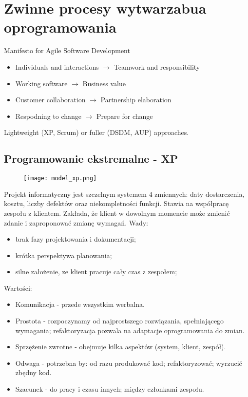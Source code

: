 \documentclass[a4paper]{article}
\begin{document}
\section{Zwinne procesy wytwarzabua oprogramowania}
Manifesto for Agile Software Development
\begin{itemize}
    \item Individuals and interactions $\rightarrow$ Teamwork and responsibility
    \item Working software $\rightarrow$ Business value
    \item Customer collaboration $\rightarrow$ Partnership elaboration
    \item Respodning to change $\rightarrow$ Prepare for change
\end{itemize}
Lightweight (XP, Scrum) or fuller (DSDM, AUP) approaches.

\subsection{Programowanie ekstremalne - XP}
\begin{figure}[!h]
    \texttt{[image: model\_xp.png]}
\end{figure}

Projekt informatyczny jest szczelnym systemem 4 zmiennych: daty dostarczenia, kosztu, liczby
defektów oraz niekompletności funkcji. Stawia na współpracę zespołu z klientem. Zakłada, że klient w dowolnym momencie może
zmienić zdanie i zaproponować zmianę wymagań.
Wady:
\begin{itemize}
    \item brak fazy projektowania i dokumentacji;
    \item krótka perspektywa planowania;
    \item silne założenie, ze klient pracuje cały czas z
zespołem;
\end{itemize}

Wartości:
    \begin{itemize}
        \item Komunikacja - przede wszystkim werbalna.
        \item Prostota - rozpoczynamy od najprostszego rozwiązania, spełniającego
wymagania; refaktoryzacja pozwala na adaptacje oprogramowania do
zmian.
        \item Sprzężenie zwrotne - obejmuje kilka aspektów (system, klient, zespół).
        \item Odwaga - potrzebna by: od razu produkować kod; refaktoryzować; wyrzucić zbędny kod.
        \item Szacunek - do pracy i czasu innych; między członkami zespołu.
    \end{itemize}
\end{document}
